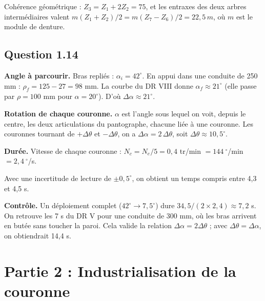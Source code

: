 \documentclass[11pt,a4paper]{article}
\newcommand{\equationajustee}[1]{%
  \sbox{\boiteequation}{$\displaystyle #1$}%
  \ifdim\wd\boiteequation>\linewidth
    \[\resizebox{\linewidth}{!}{\usebox{\boiteequation}}\]%
  \else
    \[#1\]%
  \fi}
\begin{document}
Cohérence géométrique : \(Z_3 = Z_1 + 2Z_2 = 75\), et les entraxes des deux arbres intermédiaires valent \(m(Z_1+Z_2)/2 = m(Z_7-Z_6)/2 = 22{,}5\,m\), où \(m\) est le module de denture.

\hypertarget{question-1.14}{%
\subsection{Question 1.14}\label{question-1.14}}

\textbf{Angle à parcourir.} Bras repliés : \(\alpha_i = 42^\circ\). En appui dans une conduite de 250 mm : \(\rho_f = 125 - 27 = 98\) mm. La courbe du DR VIII donne \(\alpha_f \approx 21^\circ\) (elle passe par \(\rho = 100\) mm pour \(\alpha = 20^\circ\)). D'où \(\Delta\alpha \approx 21^\circ\).

\textbf{Rotation de chaque couronne.} \(\alpha\) est l'angle sous lequel on voit, depuis le centre, les deux articulations du pantographe, chacune liée à une couronne. Les couronnes tournant de \(+\Delta\theta\) et \(-\Delta\theta\), on a \(\Delta\alpha = 2\,\Delta\theta\), soit \(\Delta\theta \approx 10{,}5^\circ\).

\textbf{Durée.} Vitesse de chaque couronne : \(N_c = N_e/5 = 0{,}4\) tr/min \(= 144\ ^\circ\)/min \(= 2{,}4\ ^\circ\)/s.

\equationajustee{\begin{aligned}
t_d &= \frac{\Delta\alpha}{2\,N_c} \\
&= \frac{21}{2\times 2{,}4}\ \text{s}
\end{aligned}}

\equationajustee{\boxed{t_d \approx 4{,}4\ \text{s}}}

Avec une incertitude de lecture de \(\pm 0{,}5^\circ\), on obtient un temps compris entre 4,3 et 4,5 s.

\textbf{Contrôle.} Un déploiement complet (\(42^\circ \to 7{,}5^\circ\)) dure \(34{,}5/(2\times 2{,}4) \approx 7{,}2\) s. On retrouve les 7 s du DR V pour une conduite de 300 mm, où les bras arrivent en butée sans toucher la paroi. Cela valide la relation \(\Delta\alpha = 2\Delta\theta\) ; avec \(\Delta\theta = \Delta\alpha\), on obtiendrait 14,4 s.

\hypertarget{partie-2-industrialisation-de-la-couronne}{%
\section{Partie 2 : Industrialisation de la couronne}\label{partie-2-industrialisation-de-la-couronne}}
\end{document}
